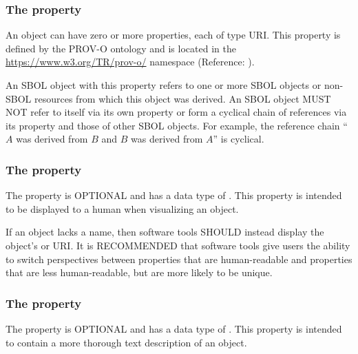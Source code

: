 
\subsubsection*{The  property}
\label{sec:prov:wasDerivedFrom}
An  object can have zero or more  properties, each of type URI. This property is defined by the PROV-O ontology and is located in the \url{https://www.w3.org/TR/prov-o/} namespace (Reference: ).

 An SBOL object with this property refers to one or more SBOL objects or non-SBOL resources from which this object was derived. An SBOL object MUST NOT refer to itself via its own  property or form a cyclical chain of references via its  property and those of other SBOL objects. For example, the reference chain ``$A$ was derived from $B$ and $B$ was derived from $A$'' is cyclical.

\subsubsection*{The  property}
\label{sec:name}

The  property is OPTIONAL and has a data type of . This property is intended to be displayed to a human when visualizing an  object.

If an  object lacks a name, then software tools SHOULD instead display the object's  or URI.
It is RECOMMENDED that software tools give users the ability to switch perspectives between  properties that are human-readable and  properties that are less human-readable, but are more likely to be unique.

\subsubsection*{The  property}
\label{sec:description}

The  property is OPTIONAL and has a data type of . This property is intended to contain a more thorough text description of an  object.

